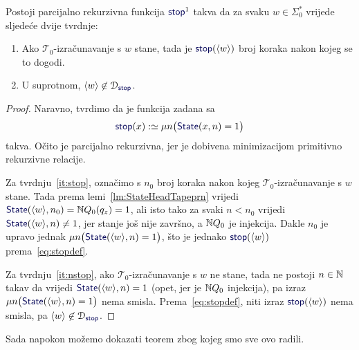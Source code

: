 \begin{lema}\label{lm:stopprek}
Postoji parcijalno rekurzivna funkcija $\f{stop}^1$ takva da za svaku $w\in\Sigma_0^*$ vrijede sljedeće dvije tvrdnje:
\begin{enumerate}
    \item\label{it:stop} Ako $\mathcal T_0$-izračunavanje s $w$ stane, tada je $\f{stop}(\kr w)$ broj koraka nakon kojeg se to dogodi.
    \item\label{it:nstop} U suprotnom, $\kr w\not\in\dom{\f{stop}}$.
\end{enumerate}
\end{lema}
\begin{proof}
Naravno, tvrdimo da je funkcija zadana sa
\begin{equation}\label{eq:stopdef}
    \f{stop}(x):\simeq\mu n\bigl(\f{State}(x,n)=1\bigr)
\end{equation}
takva. Očito je parcijalno rekurzivna, jer je dobivena minimizacijom primitivno rekurzivne relacije.

Za tvrdnju~\ref{it:stop}, označimo s $n_0$ broj koraka nakon kojeg $\mathcal T_0$-izračunavanje s $w$ stane. Tada prema lemi~\ref{lm:StateHeadTapeprn} vrijedi $\f{State}(\kr w,n_0)=\N Q_0(q_z)=1$, ali isto tako za svaki $n<n_0$ vrijedi $\f{State}(\kr w,n)\not=1$, jer stanje još nije završno, a ${\mathbb N} Q_0$ je injekcija. Dakle $n_0$ je upravo jednak $\mu n\bigl(\f{State}(\kr w,n)=1\bigr)$, što je jednako $\f{stop}(\kr w)$ prema~\eqref{eq:stopdef}.

Za tvrdnju~\ref{it:nstop}, ako $\mathcal T_0$-izračunavanje s $w$ ne stane, tada ne postoji $n\in{\mathbb N}$ takav da vrijedi $\f{State}(\kr w,n)=1$ (opet, jer je ${\mathbb N} Q_0$ injekcija), pa izraz $\mu n\bigl(\f{State}(\kr w,n)=1\bigr)$ nema smisla. Prema~\eqref{eq:stopdef}, niti izraz $\f{stop}(\kr w)$ nema smisla, pa $\kr w\not\in\dom{\f{stop}}$.
\end{proof}

Sada napokon možemo dokazati teorem zbog kojeg smo sve ovo radili.

